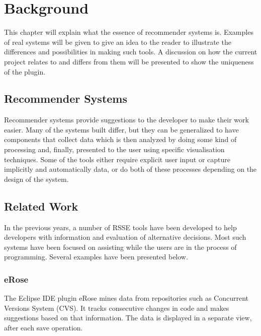 \documentclass{l4proj}
\begin{document}
\chapter{Background}

This chapter will explain what the essence of recommender systems is. Examples of real systems will be given to give an idea to the reader to illustrate the differences and possibilities in making such tools. A discussion on how the current project relates to and differs from them will be presented to show the uniqueness of the plugin. 

\section{Recommender Systems}
Recommender systems provide suggestions to the developer to make their work easier. Many of the systems built differ, but they can be generalized to have components that collect data which is then analyzed by doing some kind of processing and, finally, presented to the user using specific visualisation techniques. Some of the tools either require explicit user input or capture implicitly and automatically data, or do both of these processes depending on the design of the system.

\section{Related Work}

In the previous years, a number of RSSE tools have been developed to help developers with information and evaluation of alternative decisions. Most such systems have been focused on assisting while the users are in the process of programming. Several examples have been presented below.

\subsection{eRose}
The Eclipse IDE plugin eRose \cite{erose} mines data from repositories such as Concurrent Versions System (CVS). It tracks consecutive changes in code and makes suggestions based on that information. The data is displayed in a separate view, after each save operation.
\end{document}
